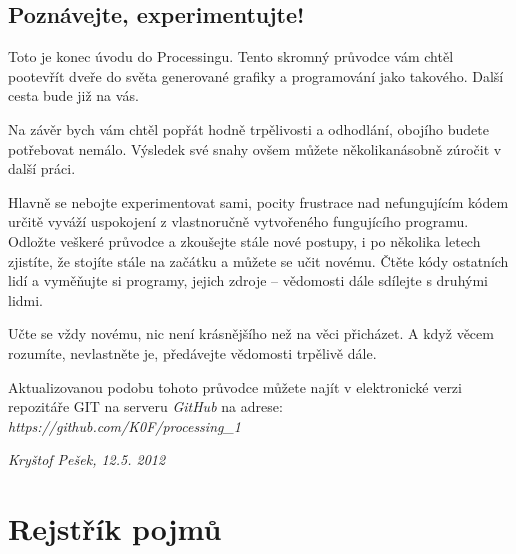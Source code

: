 \documentclass[10pt]{book}
\begin{document}
\section{Poznávejte, experimentujte!}

Toto je konec úvodu do Processingu. Tento skromný průvodce vám chtěl pootevřít dveře do světa generované grafiky a programování jako takového. Další cesta bude již na vás.

Na závěr bych vám chtěl popřát hodně trpělivosti a odhodlání, obojího budete potřebovat nemálo. Výsledek své snahy ovšem můžete několikanásobně zúročit v další práci.

Hlavně se nebojte experimentovat sami, pocity frustrace nad nefungujícím kódem určitě vyváží uspokojení z vlastnoručně vytvořeného fungujícího programu. Odložte veškeré průvodce a zkoušejte stále nové postupy, i po několika letech zjistíte, že stojíte stále na začátku a můžete se učit novému. Čtěte kódy ostatních lidí a vyměňujte si programy, jejich zdroje -- vědomosti dále sdílejte s druhými lidmi.

Učte se vždy novému, nic není krásnějšího než na věci přicházet. A když věcem rozumíte, nevlastněte je, předávejte vědomosti trpělivě dále.

\vfill

Aktualizovanou podobu tohoto průvodce můžete najít v elektronické verzi repozitáře GIT na serveru {\em GitHub} na adrese:\\
{\em https://github.com/K0F/processing\_1}

\begin{flushright}
{\em Kryštof Pešek, 12.5. 2012}
\end{flushright}

\chapter{Rejstřík pojmů}
\printglossaries

\printindex


\end{document}
